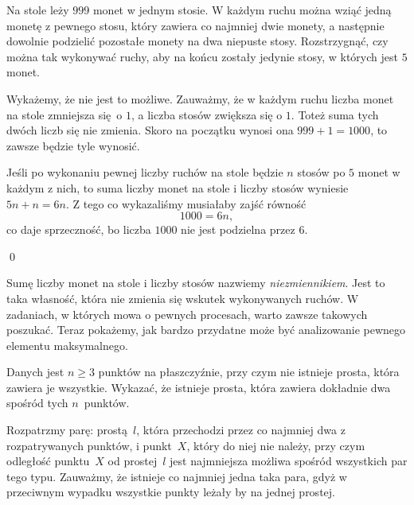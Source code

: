 



\noindent
Na stole leży $999$ monet w jednym stosie. W każdym ruchu można wziąć jedną monetę z pewnego stosu, który zawiera co najmniej dwie monety, a następnie dowolnie podzielić pozostałe monety na dwa niepuste stosy. Rozstrzygnąć, czy można tak wykonywać ruchy, aby na końcu zostały jedynie stosy, w których jest $5$ monet.

\vspace{5px}

\noindent
Wykażemy, że nie jest to możliwe. Zauważmy, że w każdym ruchu liczba monet na stole zmniejsza się o $1$, a liczba stosów zwiększa się o $1$. Toteż suma tych dwóch liczb się nie zmienia. Skoro na początku wynosi ona $999 + 1 = 1000$, to zawsze będzie tyle wynosić.

\vspace{10px}
\noindent
Jeśli po wykonaniu pewnej liczby ruchów na stole będzie $n$ stosów po $5$ monet w każdym z nich, to suma liczby monet na stole i liczby stosów wyniesie $5n + n = 6n$. Z tego co wykazaliśmy musiałaby zajść równość
\[
	1000 = 6n,
\]
co daje sprzeczność, bo liczba $1000$ nie jest podzielna przez $6$.

\qed

\noindent
Sumę liczby monet na stole i liczby stosów nazwiemy \textit{niezmiennikiem}. Jest to taka własność, która nie zmienia się wskutek wykonywanych ruchów. W zadaniach, w których mowa o pewnych procesach, warto zawsze takowych poszukać. Teraz pokażemy, jak bardzo przydatne może być analizowanie pewnego elementu maksymalnego.

\vspace{10px}


\noindent
Danych jest $n \geqslant 3$ punktów na płaszczyźnie, przy czym nie istnieje prosta, która zawiera je wszystkie. Wykazać, że istnieje prosta, która zawiera dokładnie dwa spośród tych $n$~punktów.

\vspace{5px}

\noindent
Rozpatrzmy parę: prostą~$l$, która przechodzi przez co najmniej dwa z rozpatrywanych punktów, i punkt~$X$, który do niej nie należy, przy czym odległość punktu~$X$ od prostej~$l$ jest najmniejsza możliwa spośród wszystkich par tego typu. Zauważmy, że istnieje co najmniej jedna taka para, gdyż w przeciwnym wypadku wszystkie punkty leżały by na jednej prostej. 

